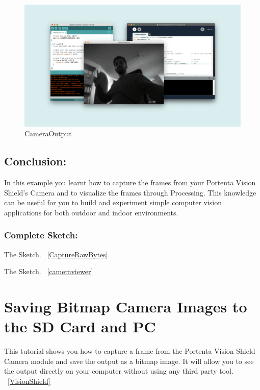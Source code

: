 	\begin{figure}
		\begin{center}
			\includegraphics[width=0.7\linewidth]{Images/VisionShield/CameraOutput.png}
			\caption{CameraOutput}
			\label{CameraOutput}
		\end{center}
	\end{figure}
	
\subsection{Conclusion:}
	In this example you learnt how to capture the frames from your Portenta Vision Shield's Camera and to visualize the frames through Processing. This knowledge can be useful for you to build and experiment simple computer vision applications for both outdoor and indoor environments.
	
	\subsubsection{Complete Sketch:}
	The  Sketch. ~\ref{CaptureRawBytes}
	
		{
			\label{CaptureRawBytes}
		}
	
		
	The  Sketch. ~\ref{cameraviewer}
		
		{
			\label{cameraviewer}
		}





\section{Saving Bitmap Camera Images to the SD Card and PC}
This tutorial shows you how to capture a frame from the Portenta Vision Shield Camera module and save the output as a bitmap image. It will allow you to see the output directly on your computer without using any third party tool. ~\ref{VisionShield} \cite{portentaCameraToBitmap:2024}

